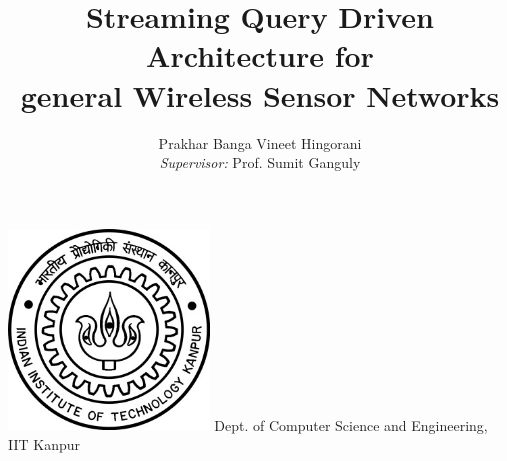 \begin{titlepage}

\title{Streaming Query Driven Architecture for \\general Wireless Sensor Networks}
\author{Prakhar Banga \qquad Vineet Hingorani\\\emph{Supervisor:} Prof. Sumit Ganguly}

\maketitle
\date{}

\vfill
\begin{center}
\includegraphics[width=0.40\textwidth]{./IIT_Kanpur_Logo.jpg}
\vfill
\LARGE{Dept. of Computer Science and Engineering, \\IIT Kanpur}

\end{center}
\end{titlepage}
